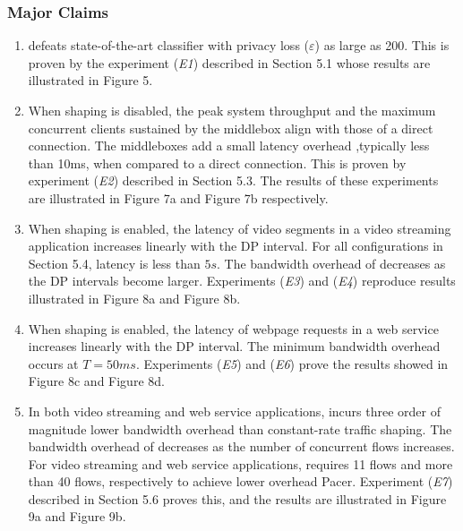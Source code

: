 \subsubsection{Major Claims}\label{subsubsec:major-claims}
\begin{enumerate}[label=\textbf{(C\arabic*):}, leftmargin=1.2cm]  %
  \item {\sys} defeats state-of-the-art classifier with privacy loss ($\varepsilon$) as large as 200. This is proven by the experiment (\textit{E1}) described in Section 5.1 whose results are illustrated in Figure 5.
  \item When shaping is disabled, the peak system throughput and the maximum concurrent clients sustained by the {\sys} middlebox align with those of a direct connection. The {\sys} middleboxes add a small latency overhead ,typically less than 10ms, when compared to a direct connection. This is proven by  experiment (\textit{E2}) described in Section 5.3. The results of these experiments are illustrated in Figure 7a and Figure 7b respectively.
  \item When shaping is enabled, the latency of video segments in a video streaming application increases linearly with the DP interval. For all configurations in Section 5.4, {\sys} latency is less than $5s$. The bandwidth overhead of {\sys} decreases as the DP intervals become larger. Experiments (\textit{E3}) and (\textit{E4}) reproduce results illustrated in Figure 8a and Figure 8b.  
  \item When shaping is enabled, the latency of webpage requests in a web service increases linearly with the DP interval. The minimum bandwidth overhead occurs at $T=50ms$. Experiments (\textit{E5}) and (\textit{E6}) prove the results showed in Figure 8c and Figure 8d. 
  \item In both video streaming and web service applications, {\sys} incurs three order of magnitude lower bandwidth overhead than constant-rate traffic shaping. The bandwidth overhead of {\sys} decreases as the number of concurrent flows increases. For video streaming and web service applications, {\sys} requires 11
  flows and more than 40 flows, respectively to achieve lower
  overhead Pacer. 
  Experiment (\textit{E7}) described in Section 5.6 proves this, and the results are illustrated in Figure 9a and Figure 9b.
\end{enumerate}


